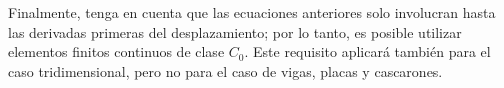 \documentclass[12pt,letterpaper, landscape]{article}
\newcommand{\e}{{}}
\newcommand{\ma}[1]{{\boldsymbol{#1}}}
\newcommand{\dd}{\operatorname{d} \!}
\begin{document}
Finalmente, tenga en cuenta que las ecuaciones anteriores solo involucran hasta las derivadas primeras del desplazamiento; por lo tanto, es posible utilizar elementos finitos continuos de clase $C_0$. Este requisito aplicará también para el caso tridimensional, pero no para el caso de vigas, placas y cascarones.

%
%
\end{document}

